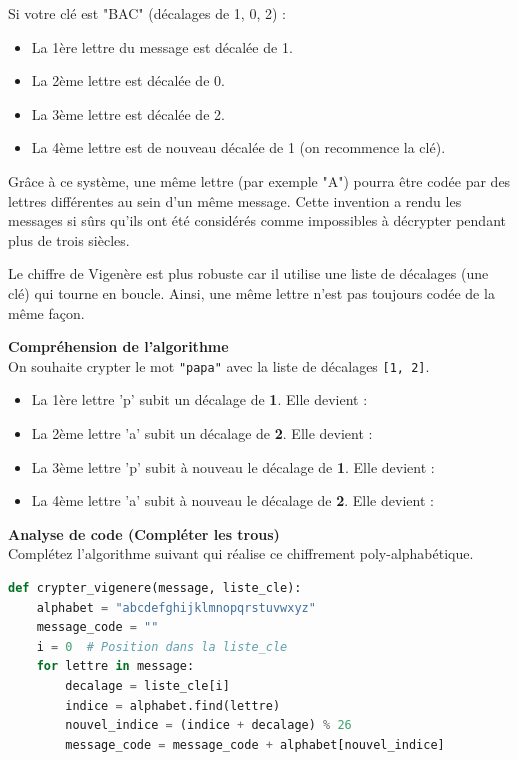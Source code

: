 Si votre clé est "BAC" (décalages de 1, 0, 2) :
\begin{itemize}
    \item La 1ère lettre du message est décalée de 1.
    \item La 2ème lettre est décalée de 0.
    \item La 3ème lettre est décalée de 2.
    \item La 4ème lettre est de nouveau décalée de 1 (on recommence la clé).
\end{itemize}
Grâce à ce système, une même lettre (par exemple "A") pourra être codée par des lettres différentes au sein d'un même message. Cette invention a rendu les messages si sûrs qu'ils ont été considérés comme impossibles à décrypter pendant plus de trois siècles.

\begin{Exercise}[title={Le Chiffre de Vigenère : La sécurité par la rotation}]

Le chiffre de Vigenère est plus robuste car il utilise une liste de décalages (une clé) qui tourne en boucle. Ainsi, une même lettre n'est pas toujours codée de la même façon.

\Question \textbf{Compréhension de l'algorithme} \\
On souhaite crypter le mot \texttt{"papa"} avec la liste de décalages \texttt{[1, 2]}.
\begin{itemize}
    \item La 1ère lettre 'p' subit un décalage de \textbf{1}. Elle devient : \dotfill
    \item La 2ème lettre 'a' subit un décalage de \textbf{2}. Elle devient : \dotfill
    \item La 3ème lettre 'p' subit à nouveau le décalage de \textbf{1}. Elle devient : \dotfill
    \item La 4ème lettre 'a' subit à nouveau le décalage de \textbf{2}. Elle devient : \dotfill
\end{itemize}

\Question \textbf{Analyse de code (Compléter les trous)} \\
Complétez l'algorithme suivant qui réalise ce chiffrement poly-alphabétique.

\begin{lstlisting}[style=pythonstyle, language=python]
def crypter_vigenere(message, liste_cle):
    alphabet = "abcdefghijklmnopqrstuvwxyz"
    message_code = ""
    i = 0  # Position dans la liste_cle
    for lettre in message:
        decalage = liste_cle[i]
        indice = alphabet.find(lettre)
        nouvel_indice = (indice + decalage) % 26
        message_code = message_code + alphabet[nouvel_indice]
        

\end{lstlisting}
\end{Exercise}
